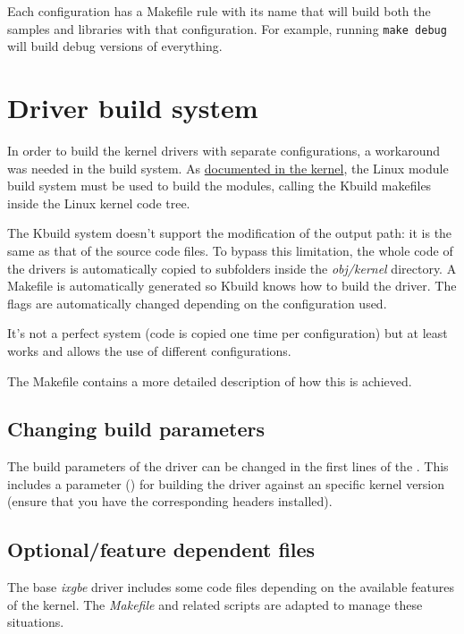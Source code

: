 \documentclass[oneside]{hpman}
\begin{document}
Each configuration has a Makefile rule with its name that will build both the samples and libraries with that configuration. For example, running \texttt{make debug} will build debug versions of everything.

\section{Driver build system}
\label{sec:build:driver}

In order to build the kernel drivers with separate configurations, a workaround was needed in the build system. As \href{https://www.kernel.org/doc/Documentation/kbuild/modules.txt}{documented in the kernel}, the Linux module build system must be used to build the modules, calling the Kbuild makefiles inside the Linux kernel code tree.

The Kbuild system doesn't support the modification of the output path: it is the same as that of the source code files. To bypass this limitation, the whole code of the drivers is automatically copied to subfolders inside the \textit{obj/kernel} directory. A Makefile is automatically generated so Kbuild knows how to build the driver. The flags are automatically changed depending on the configuration used.

It's not a perfect system (code is copied one time per configuration) but at least works and allows the use of different configurations.

The Makefile contains a more detailed description of how this is achieved.

\subsection{Changing build parameters}

The build parameters of the driver can be changed in the first lines of the . This includes a parameter () for building the driver against an specific kernel version (ensure that you have the corresponding headers installed).

\subsection{Optional/feature dependent files}

The base \textit{ixgbe} driver includes some code files depending on the available features of the kernel. The \textit{Makefile} and related scripts are adapted to manage these situations.
\end{document}
